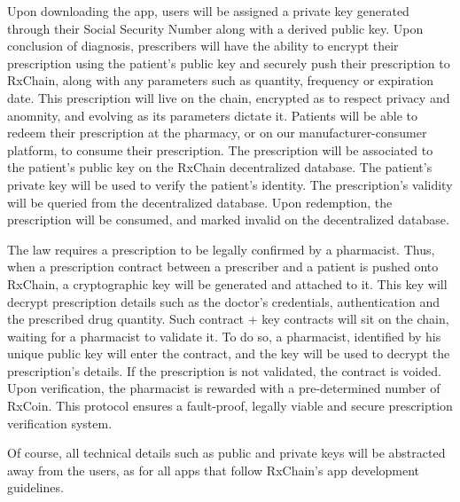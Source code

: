 Upon downloading the app, users will be assigned a private key generated through their Social Security Number
along with a derived public key.
Upon conclusion of diagnosis, prescribers will have the ability to encrypt their prescription using the patient's public key
and securely push their prescription to RxChain, along with any parameters such as quantity, frequency or expiration date.
This prescription will live on the chain, encrypted as to respect privacy and anomnity, and evolving as its parameters dictate it.
Patients will be able to redeem their prescription at the pharmacy, or on our manufacturer-consumer platform, to consume their prescription.
The prescription will be associated to the patient's public key on the RxChain decentralized database.
The patient's private key will be used to verify the patient's identity.
The prescription's validity will be queried from the decentralized database.
Upon redemption, the prescription will be consumed, and marked invalid on the decentralized database.

The law requires a prescription to be legally confirmed by a pharmacist.
Thus, when a prescription contract between a prescriber and a patient is pushed onto RxChain,
a cryptographic key will be generated and attached to it.
This key will decrypt prescription details such as the doctor's credentials, authentication and the prescribed drug quantity.
Such contract + key contracts will sit on the chain, waiting for a pharmacist to validate it.
To do so, a pharmacist, identified by his unique public key will enter the contract,
and the key will be used to decrypt the prescription's details.
If the prescription is not validated, the contract is voided.
Upon verification, the pharmacist is rewarded with a pre-determined number of RxCoin.
This protocol ensures a fault-proof, legally viable and secure
prescription verification system.

Of course, all technical details such as public and private keys will be abstracted away from the users,
as for all apps that follow RxChain's app development guidelines.

